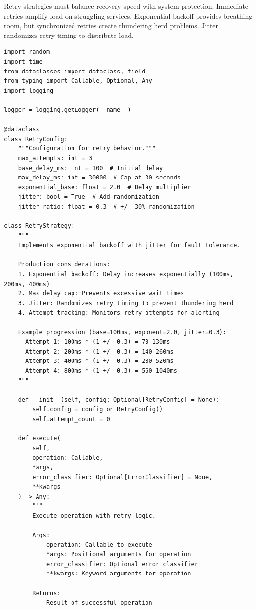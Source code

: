 Retry strategies must balance recovery speed with system protection. Immediate retries amplify load on struggling services. Exponential backoff provides breathing room, but synchronized retries create thundering herd problems. Jitter randomizes retry timing to distribute load.

\begin{lstlisting}[style=python, caption={Production Retry Strategy}]
import random
import time
from dataclasses import dataclass, field
from typing import Callable, Optional, Any
import logging

logger = logging.getLogger(__name__)

@dataclass
class RetryConfig:
    """Configuration for retry behavior."""
    max_attempts: int = 3
    base_delay_ms: int = 100  # Initial delay
    max_delay_ms: int = 30000  # Cap at 30 seconds
    exponential_base: float = 2.0  # Delay multiplier
    jitter: bool = True  # Add randomization
    jitter_ratio: float = 0.3  # +/- 30% randomization

class RetryStrategy:
    """
    Implements exponential backoff with jitter for fault tolerance.

    Production considerations:
    1. Exponential backoff: Delay increases exponentially (100ms, 200ms, 400ms)
    2. Max delay cap: Prevents excessive wait times
    3. Jitter: Randomizes retry timing to prevent thundering herd
    4. Attempt tracking: Monitors retry attempts for alerting

    Example progression (base=100ms, exponent=2.0, jitter=0.3):
    - Attempt 1: 100ms * (1 +/- 0.3) = 70-130ms
    - Attempt 2: 200ms * (1 +/- 0.3) = 140-260ms
    - Attempt 3: 400ms * (1 +/- 0.3) = 280-520ms
    - Attempt 4: 800ms * (1 +/- 0.3) = 560-1040ms
    """

    def __init__(self, config: Optional[RetryConfig] = None):
        self.config = config or RetryConfig()
        self.attempt_count = 0

    def execute(
        self,
        operation: Callable,
        *args,
        error_classifier: Optional[ErrorClassifier] = None,
        **kwargs
    ) -> Any:
        """
        Execute operation with retry logic.

        Args:
            operation: Callable to execute
            *args: Positional arguments for operation
            error_classifier: Optional error classifier
            **kwargs: Keyword arguments for operation

        Returns:
            Result of successful operation


\end{lstlisting}
